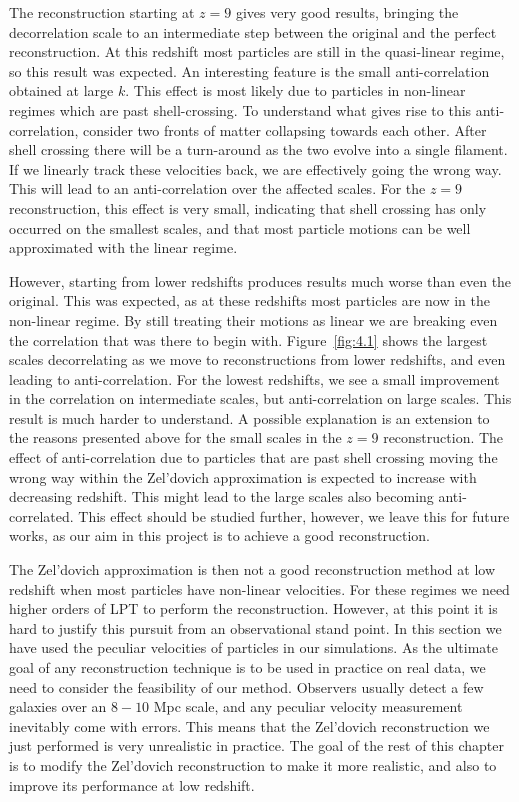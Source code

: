 The reconstruction starting at $z=9$ gives very good results, bringing the decorrelation scale to an intermediate step between the original and the perfect reconstruction. At this redshift most particles are still in the quasi-linear regime, so this result was expected. An interesting feature is the small anti-correlation obtained at large $k$. This effect is most likely due to particles in non-linear regimes which are past shell-crossing. To understand what gives rise to this anti-correlation, consider two fronts of matter collapsing towards each other. After shell crossing  there will be a turn-around as the two evolve into a single filament. If we linearly track these velocities back, we are effectively going the wrong way. This will lead to an anti-correlation over the affected scales. For the $z=9$ reconstruction, this effect is very small, indicating that shell crossing has only occurred on the smallest scales, and that most particle motions can be well approximated with the linear regime. 

However, starting from lower redshifts produces results much worse than even the original. This was expected, as at these redshifts most particles are now in the non-linear regime. By still treating their motions as linear we are breaking even the correlation that was there to begin with. Figure~\ref{fig:4.1} shows the largest scales decorrelating as we move to reconstructions from lower redshifts, and even leading to anti-correlation. For the lowest redshifts, we see a small improvement in the correlation on intermediate scales, but anti-correlation on large scales. This result is much harder to understand. A possible explanation is an extension to the reasons presented above for the small scales in the $z=9$ reconstruction. The effect of anti-correlation due to particles that are past shell crossing moving the wrong way within the Zel'dovich approximation is expected to increase with decreasing redshift. This might lead to the large scales also becoming anti-correlated. This effect should be studied further, however, we leave this for future works, as our aim in this project is to achieve a good reconstruction.

The Zel'dovich approximation is then not a good reconstruction method at low redshift when most particles have non-linear velocities. For these regimes we need higher orders of LPT to perform the reconstruction. However, at this point it is hard to justify this pursuit from an observational stand point. In this section we have used the peculiar velocities of particles in our simulations. As the ultimate goal of any reconstruction technique is to be used in practice on real data, we need to consider the feasibility of our method. Observers usually detect a few galaxies over an $8-10$ Mpc scale, and any peculiar velocity measurement inevitably come with errors. This means that the Zel'dovich reconstruction we just performed is very unrealistic in practice. The goal of the rest of this chapter is to modify the Zel'dovich reconstruction to make it more realistic, and also to improve its performance at low redshift.

